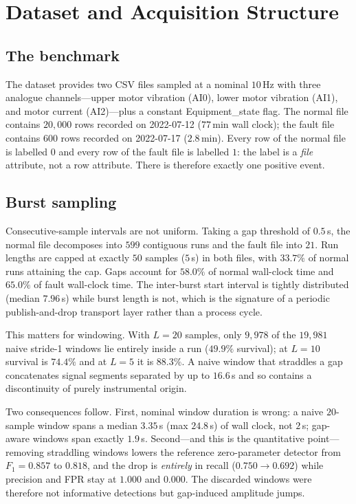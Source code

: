 \documentclass[twocolumn,10pt]{article}
\begin{document}
\section{Dataset and Acquisition Structure}
\label{sec:data}

\subsection{The benchmark}

The dataset provides two CSV files sampled at a nominal $10$\,Hz with three
analogue channels---upper motor vibration (\textsf{AI0}), lower motor vibration
(\textsf{AI1}), and motor current (\textsf{AI2})---plus a constant
\textsf{Equipment\_state} flag. The normal file contains $20{,}000$ rows
recorded on 2022-07-12 ($77$\,min wall clock); the fault file contains $600$
rows recorded on 2022-07-17 ($2.8$\,min). Every row of the normal file is
labelled $0$ and every row of the fault file is labelled $1$: the label is a
\emph{file} attribute, not a row attribute. There is therefore exactly one
positive event.

\subsection{Burst sampling}

Consecutive-sample intervals are not uniform. Taking a gap threshold of
$0.5$\,s, the normal file decomposes into $599$ contiguous runs and the fault
file into $21$. Run lengths are capped at exactly $50$ samples ($5$\,s) in both
files, with $33.7\%$ of normal runs attaining the cap. Gaps account for
$58.0\%$ of normal wall-clock time and $65.0\%$ of fault wall-clock time. The
inter-burst start interval is tightly distributed (median $7.96$\,s) while
burst length is not, which is the signature of a periodic publish-and-drop
transport layer rather than a process cycle.

This matters for windowing. With $L=20$ samples, only $9{,}978$ of the $19{,}981$
naive stride-1 windows lie entirely inside a run ($49.9\%$ survival); at $L=10$
survival is $74.4\%$ and at $L=5$ it is $88.3\%$. A naive window that straddles
a gap concatenates signal segments separated by up to $16.6$\,s and so contains
a discontinuity of purely instrumental origin.

Two consequences follow. First, nominal window duration is wrong: a naive
$20$-sample window spans a median $3.35$\,s (max $24.8$\,s) of wall clock, not
$2$\,s; gap-aware windows span exactly $1.9$\,s. Second---and this is the
quantitative point---removing straddling windows lowers the reference
zero-parameter detector from $F_1=0.857$ to $0.818$, and the drop is
\emph{entirely} in recall ($0.750\rightarrow0.692$) while precision and FPR stay
at $1.000$ and $0.000$. The discarded windows were therefore not informative
detections but gap-induced amplitude jumps.
\end{document}
